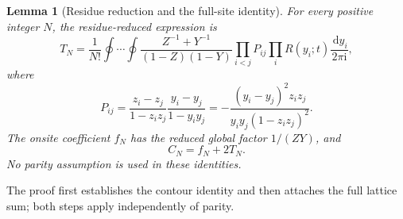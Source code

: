 \documentclass[11pt]{article}
\numberwithin{equation}{section}
\newtheorem{lemma}[theorem]{Lemma}
\theoremstyle{definition}
\newcommand{\dd}{\,\mathrm d}
\newcommand{\ii}{\mathrm i}
\begin{document}
\begin{lemma}[Residue reduction and the full-site identity]\label{lem:residue}
For every positive integer $N$, the residue-reduced expression is
\begin{equation}
 T_N=\frac1{N!}\oint\cdots\oint
 \frac{Z^{-1}+Y^{-1}}{(1-Z)(1-Y)}
 \prod_{i<j}P_{ij}\prod_i R(y_i;t)\frac{\dd y_i}{2\pi\ii},
 \label{eq:reduced}
\end{equation}
where
\begin{equation}
 P_{ij}=\frac{z_i-z_j}{1-z_iz_j}\frac{y_i-y_j}{1-y_iy_j}
 =-\frac{(y_i-y_j)^2z_iz_j}{y_iy_j(1-z_iz_j)^2}.
 \label{eq:pair}
\end{equation}
The onsite coefficient $f_N$ has the reduced global factor $1/(ZY)$,
and
\begin{equation}
 C_N=f_N+2T_N.\label{eq:onsiteidentity}
\end{equation}
No parity assumption is used in these identities.
\end{lemma}
The proof first establishes the contour identity and then attaches the
full lattice sum; both steps apply independently of parity.
\end{document}
